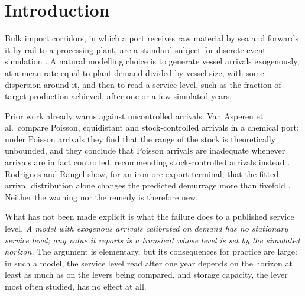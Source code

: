 \documentclass[conference]{IEEEtran}   %
\begin{document}
\section{Introduction}

Bulk import corridors, in which a port receives raw material by sea and forwards it by rail
to a processing plant, are a standard subject for discrete-event simulation
\cite{vanvianen2014,deswaanarons2004}. A natural modelling choice is to generate vessel
arrivals exogenously, at a mean rate equal to plant demand divided by vessel size, with some
dispersion around it, and then to read a service level, such as the fraction of target
production achieved, after one or a few simulated years.

Prior work already warns against uncontrolled arrivals. Van Asperen et al.\ compare Poisson,
equidistant and stock-controlled arrivals in a chemical port; under Poisson arrivals they find
that the range of the stock is theoretically unbounded, and they conclude that Poisson
arrivals are inadequate whenever arrivals are in fact controlled, recommending
stock-controlled arrivals instead \cite{vanasperen2003}. Rodrigues and Rangel show, for an
iron-ore export terminal, that the fitted arrival distribution alone changes the predicted
demurrage more than fivefold \cite{rodrigues2016}. Neither the warning nor the remedy is
therefore new.

What has not been made explicit is what the failure does to a published service level.
\emph{A model with exogenous arrivals calibrated on demand has no stationary service level;
any value it reports is a transient whose level is set by the simulated horizon.} The
argument is elementary, but its consequences for practice are large: in such a model, the
service level read after one year depends on the horizon at least as much as on the levers
being compared, and storage capacity, the lever most often studied, has no effect at all.
\end{document}
